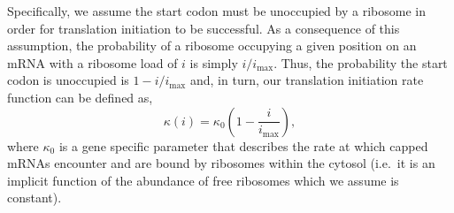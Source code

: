 \documentclass[review]{elsarticle}
\newcommand{\imax}{\ensuremath{{i_{\max}}}\xspace}
\begin{document}
Specifically, we assume the start codon must be unoccupied by a ribosome in order for translation initiation to be successful.
As a consequence of this assumption, the probability of a ribosome occupying a given position on an mRNA with a ribosome load of $i$ is simply $i/\imax$.
Thus, the probability the start codon is unoccupied is $1-i/\imax$ and, in turn, our translation initiation rate function can be defined as, 
\begin{equation}
\kappa(i)=\kappa_0\left(1-\frac{i}{\imax}\right),
\end{equation} 
where $\kappa_0$ is a gene specific parameter that describes the rate at which capped mRNAs encounter and are bound by ribosomes within the cytosol (i.e.~it is an implicit function of the abundance of free ribosomes which we assume is constant).

\end{document}
